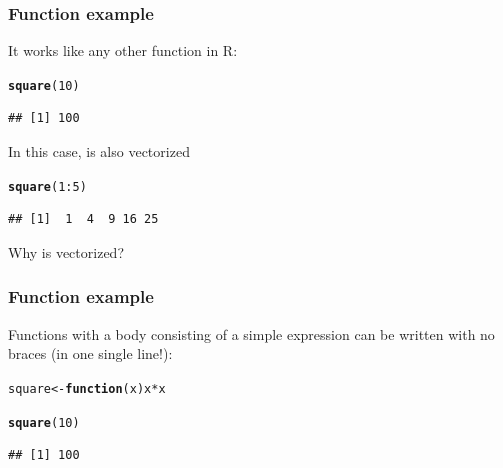 \documentclass[12pt]{beamer}\usepackage[]{graphicx}\usepackage[]{color}
\makeatletter
\newcommand{\hlnum}[1]{\textcolor[rgb]{0.686,0.059,0.569}{#1}}%
\newcommand{\hlopt}[1]{\textcolor[rgb]{0,0,0}{#1}}%
\newcommand{\hlstd}[1]{\textcolor[rgb]{0.345,0.345,0.345}{#1}}%
\newcommand{\hlkwa}[1]{\textcolor[rgb]{0.161,0.373,0.58}{\textbf{#1}}}%
\newcommand{\hlkwb}[1]{\textcolor[rgb]{0.69,0.353,0.396}{#1}}%
\newcommand{\hlkwc}[1]{\textcolor[rgb]{0.333,0.667,0.333}{#1}}%
\newcommand{\hlkwd}[1]{\textcolor[rgb]{0.737,0.353,0.396}{\textbf{#1}}}%
\newenvironment{kframe}{%
 \def\at@end@of@kframe{}%
 \ifinner\ifhmode%
  \def\at@end@of@kframe{\end{minipage}}%
  \begin{minipage}{\columnwidth}%
 \fi\fi%
 \def\FrameCommand##1{\hskip\@totalleftmargin \hskip-\fboxsep
 \colorbox{shadecolor}{##1}\hskip-\fboxsep
     \hskip-\linewidth \hskip-\@totalleftmargin \hskip\columnwidth}%
 \MakeFramed {\advance\hsize-\width
   \@totalleftmargin\z@ \linewidth\hsize
   \@setminipage}}%
 {\par\unskip\endMakeFramed%
 \at@end@of@kframe}
\newenvironment{knitrout}{}{} %
\makeatother
\begin{document}

\begin{frame}[fragile]
\frametitle{Function example}

It works like any other function in R:
\begin{knitrout}\footnotesize
{}\color{fgcolor}\begin{kframe}
\begin{alltt}
\hlkwd{square}\hlstd{(}\hlnum{10}\hlstd{)}
\end{alltt}
\begin{verbatim}
## [1] 100
\end{verbatim}
\end{kframe}
\end{knitrout}

In this case,  is also vectorized
\begin{knitrout}\footnotesize
{}\color{fgcolor}\begin{kframe}
\begin{alltt}
\hlkwd{square}\hlstd{(}\hlnum{1}\hlopt{:}\hlnum{5}\hlstd{)}
\end{alltt}
\begin{verbatim}
## [1]  1  4  9 16 25
\end{verbatim}
\end{kframe}
\end{knitrout}
Why is  vectorized?

\end{frame}


\begin{frame}[fragile]
\frametitle{Function example}

Functions with a body consisting of a simple expression can be written with no braces (in one single line!):
\begin{knitrout}\footnotesize
{}\color{fgcolor}\begin{kframe}
\begin{alltt}
\hlstd{square} \hlkwb{<-} \hlkwa{function}\hlstd{(}\hlkwc{x}\hlstd{) x} \hlopt{*} \hlstd{x}

\hlkwd{square}\hlstd{(}\hlnum{10}\hlstd{)}
\end{alltt}
\begin{verbatim}
## [1] 100
\end{verbatim}
\end{kframe}
\end{knitrout}

\end{frame}
\end{document}
